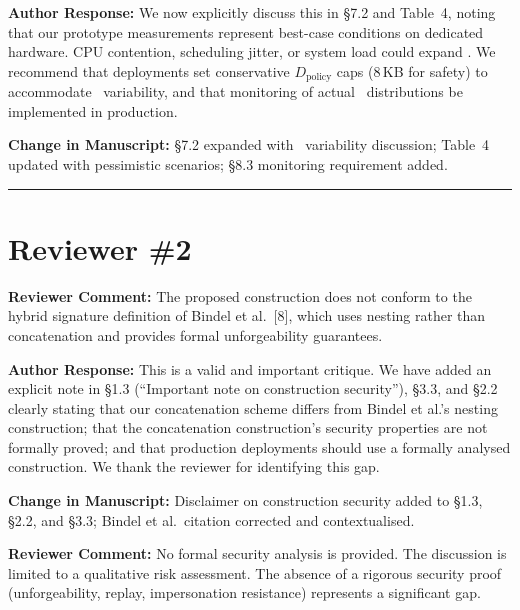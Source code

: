 \documentclass[12pt]{article}
\newcommand{\RC}[1]{\textcolor{reviewerblue}{\textbf{Reviewer Comment:}} #1}
\newcommand{\AR}[1]{\textcolor{replygreen}{\textbf{Author Response:}} #1}
\newcommand{\CH}[1]{\textcolor{changemagenta}{\textbf{Change in Manuscript:}} #1}
\begin{document}
\begin{replybox}
\AR{We now explicitly discuss this in \S7.2 and Table~4, noting that our
prototype measurements represent best-case conditions on dedicated hardware.
CPU contention, scheduling jitter, or system load could expand \Dt.  We
recommend that deployments set conservative $D_{\text{policy}}$ caps
(8\,KB for safety) to accommodate \Dt\ variability, and that monitoring
of actual \Dt\ distributions be implemented in production.}

\CH{\S7.2 expanded with \Dt\ variability discussion; Table~4 updated with
pessimistic scenarios; \S8.3 monitoring requirement added.}
\end{replybox}

\vspace{1em}
\hrule
\vspace{1em}

\section*{Reviewer \#2}

\begin{reviewbox}
\RC{The proposed construction does not conform to the hybrid signature
definition of Bindel et al.\ [8], which uses nesting rather than
concatenation and provides formal unforgeability guarantees.}
\end{reviewbox}

\begin{replybox}
\AR{This is a valid and important critique.  We have added an explicit note
in \S1.3 (``Important note on construction security''), \S3.3, and \S2.2
clearly stating that our concatenation scheme differs from Bindel et al.'s
nesting construction; that the concatenation construction's security
properties are not formally proved; and that production deployments should
use a formally analysed construction.  We thank the reviewer for identifying
this gap.}

\CH{Disclaimer on construction security added to \S1.3, \S2.2, and \S3.3;
Bindel et al.\ citation corrected and contextualised.}
\end{replybox}

\begin{reviewbox}
\RC{No formal security analysis is provided.  The discussion is limited to a
qualitative risk assessment.  The absence of a rigorous security proof
(unforgeability, replay, impersonation resistance) represents a significant gap.}
\end{reviewbox}
\end{document}
